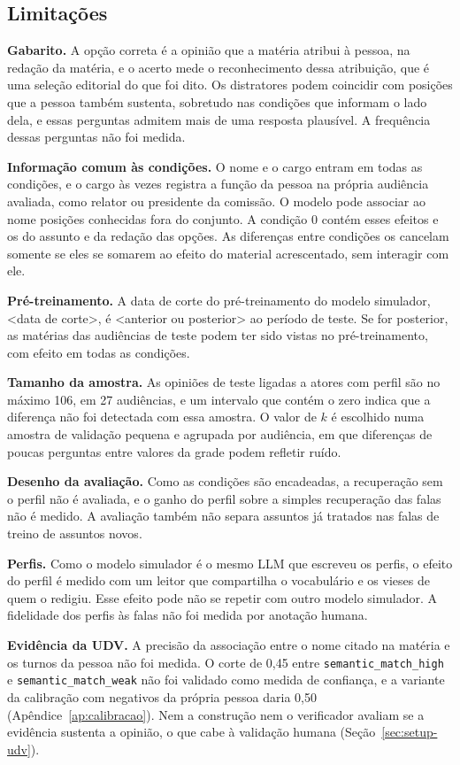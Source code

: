 \subsection{Limitações}
\label{sec:limitacoes}

\textbf{Gabarito.} A opção correta é a opinião que a matéria atribui à pessoa, na redação da
matéria, e o acerto mede o reconhecimento dessa atribuição, que é uma seleção editorial do que foi
dito. Os distratores podem coincidir com posições que a pessoa também sustenta, sobretudo nas
condições que informam o lado dela, e essas perguntas admitem mais de uma resposta plausível. A
frequência dessas perguntas não foi medida.

\textbf{Informação comum às condições.} O nome e o cargo entram em todas as condições, e o cargo às
vezes registra a função da pessoa na própria audiência avaliada, como relator ou presidente da
comissão. O modelo pode associar ao nome posições conhecidas fora do conjunto. A condição 0 contém
esses efeitos e os do assunto e da redação das opções. As diferenças entre condições os cancelam
somente se eles se somarem ao efeito do material acrescentado, sem interagir com ele.

\textbf{Pré-treinamento.} A data de corte do pré-treinamento do modelo simulador, <data de corte>, é
<anterior ou posterior> ao período de teste. Se for posterior, as matérias das audiências de teste
podem ter sido vistas no pré-treinamento, com efeito em todas as condições.

\textbf{Tamanho da amostra.} As opiniões de teste ligadas a atores com perfil são no máximo 106, em
27 audiências, e um intervalo que contém o zero indica que a diferença não foi detectada com essa
amostra. O valor de $k$ é escolhido numa amostra de validação pequena e agrupada por audiência, em
que diferenças de poucas perguntas entre valores da grade podem refletir ruído.

\textbf{Desenho da avaliação.} Como as condições são encadeadas, a recuperação sem o perfil não é
avaliada, e o ganho do perfil sobre a simples recuperação das falas não é medido. A avaliação
também não separa assuntos já tratados nas falas de treino de assuntos novos.

\textbf{Perfis.} Como o modelo simulador é o mesmo LLM que escreveu os perfis, o efeito do perfil é
medido com um leitor que compartilha o vocabulário e os vieses de quem o redigiu. Esse efeito pode
não se repetir com outro modelo simulador. A fidelidade dos perfis às falas não foi medida por
anotação humana.

\textbf{Evidência da UDV.} A precisão da associação entre o nome citado na matéria e os turnos da
pessoa não foi medida. O corte de 0,45 entre \texttt{semantic\_match\_high} e
\texttt{semantic\_match\_weak} não foi validado como medida de confiança, e a variante da calibração
com negativos da própria pessoa daria 0,50 (Apêndice~\ref{ap:calibracao}). Nem a construção nem o
verificador avaliam se a evidência sustenta a opinião, o que cabe à validação humana
(Seção~\ref{sec:setup-udv}).
